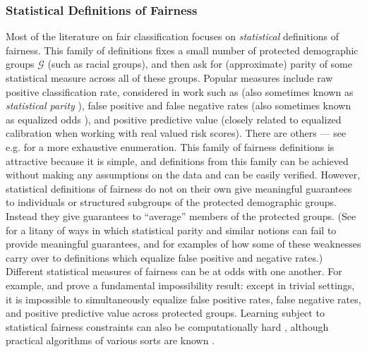 \subsubsection{Statistical Definitions of Fairness}
Most of the literature on fair classification focuses on \emph{statistical} definitions of fairness. This family of definitions fixes a
small number of protected demographic groups $\mathcal{G}$ (such as racial groups), and then ask for (approximate)
parity of some statistical measure across all of these groups. Popular measures include raw positive classification rate, considered in work such as \cite{CV10,KAS11,awareness,feldman2015certifying} (also sometimes known as \emph{statistical parity} \cite{awareness}), false positive and false negative rates \cite{Chou16,KMR16,HPS16,ZVGG17} (also sometimes known as equalized odds \cite{HPS16}), and positive predictive value \cite{Chou16,KMR16} (closely related to equalized calibration when working with real valued risk scores). There are others --- see e.g. \cite{berksurvey} for a more exhaustive enumeration. This family of fairness definitions is attractive because it is simple, and definitions from this family can be achieved without making any assumptions on the data and can be easily verified. However, statistical definitions of fairness do not on their own give meaningful guarantees to individuals or structured subgroups of the protected demographic groups. Instead they give guarantees to ``average'' members of the protected groups. (See \cite{awareness} for a litany of ways in which statistical parity and similar notions can fail to provide meaningful guarantees, and \cite{gerrymandering} for examples of how some of these weaknesses carry over to definitions which equalize false positive and negative rates.) Different statistical measures of fairness can be at odds with one another. For example, \cite{Chou16} and \cite{KMR16} prove a fundamental impossibility result: except in trivial settings, it is impossible to simultaneously equalize false positive rates, false negative rates, and positive predictive value across protected groups. Learning subject to statistical fairness constraints can also be computationally hard \cite{hardnesspaper}, although practical  algorithms of various sorts are known \cite{HPS16,ZVGG17,MSRpaper}.
